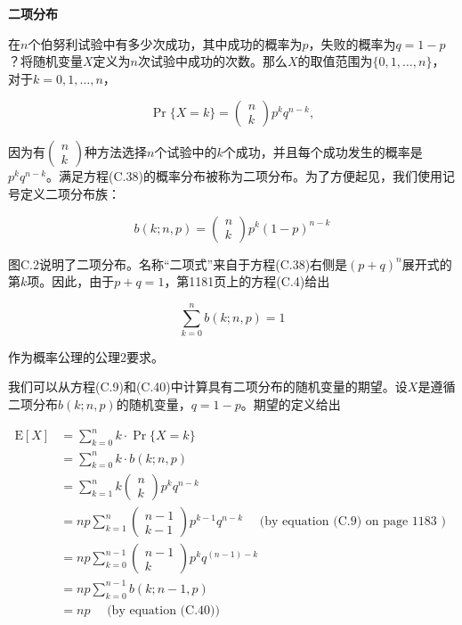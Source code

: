 \documentclass[lang=cn,newtx,10pt,scheme=chinese]{elegantbook}
\begin{document}
\textbf{二项分布}

在$n$个伯努利试验中有多少次成功，其中成功的概率为$p$，失败的概率为$q=1-p$？将随机变量$X$定义为$n$次试验中成功的次数。那么$X$的取值范围为$\{0,1, \ldots, n\}$，对于$k=0,1, \ldots, n$，

$$
\operatorname{Pr}\{X=k\}=\left(\begin{array}{l}
n \\
k
\end{array}\right) p^k q^{n-k},
$$

因为有$\left(\begin{array}{l}n \\ k\end{array}\right)$种方法选择$n$个试验中的$k$个成功，并且每个成功发生的概率是$p^k q^{n-k}$。满足方程(C.38)的概率分布被称为二项分布。为了方便起见，我们使用记号定义二项分布族：

$$
b(k ; n, p)=\left(\begin{array}{l}
n \\
k
\end{array}\right) p^k(1-p)^{n-k}
$$

图C.2说明了二项分布。名称“二项式”来自于方程(C.38)右侧是$(p+q)^n$展开式的第$k$项。因此，由于$p+q=1$，第1181页上的方程(C.4)给出

$$
\sum_{k=0}^n b(k ; n, p)=1
$$

作为概率公理的公理2要求。

我们可以从方程(C.9)和(C.40)中计算具有二项分布的随机变量的期望。设$X$是遵循二项分布$b(k; n, p)$的随机变量，$q=1-p$。期望的定义给出

$$
\begin{aligned}
\mathrm{E}[X] & =\sum_{k=0}^n k \cdot \operatorname{Pr}\{X=k\} \\
& =\sum_{k=0}^n k \cdot b(k ; n, p) \\
& =\sum_{k=1}^n k\left(\begin{array}{l}
n \\
k
\end{array}\right) p^k q^{n-k} \\
& =n p \sum_{k=1}^n\left(\begin{array}{c}
n-1 \\
k-1
\end{array}\right) p^{k-1} q^{n-k} \quad \text { (by equation (C.9) on page } 1183 \text { ) } \\
& =n p \sum_{k=0}^{n-1}\left(\begin{array}{c}
n-1 \\
k
\end{array}\right) p^k q^{(n-1)-k} \quad \\
& =n p \sum_{k=0}^{n-1} b(k ; n-1, p) \\
& =n p \quad \text { (by equation (C.40)) }
\end{aligned}
$$
\end{document}
